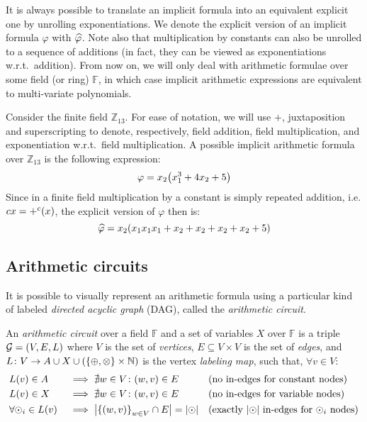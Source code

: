 It is always possible to translate an implicit formula into an equivalent explicit one by unrolling 
exponentiations.
We denote the explicit version of an implicit formula \(\varphi \) with \(\explicit{\varphi}\).
Note also that multiplication by constants can also be unrolled to a sequence of additions 
(in fact, they can be viewed as exponentiations w.r.t.\ addition).
From now on, we will only deal with arithmetic formulae over some field (or ring) \(\mathbb{F}\), 
in which case implicit arithmetic expressions are equivalent to multi-variate polynomials.
\begin{example}\label{ex:arithmetic_formula}
  Consider the finite field \(\mathbb{Z}_{13}\).
  For ease of notation, we will use \(+\), juxtaposition and superscripting to denote, respectively,
  field addition, field multiplication, and exponentiation w.r.t.\ field multiplication. 
  A possible implicit arithmetic formula over \(\mathbb{Z}_{13}\) is the following expression:
  \[\varphi = x_{2}\Parens*{x_{1}^{3} + 4x_{2} + 5}\]
  Since in a finite field multiplication by a constant is simply repeated addition, i.e. 
  \(cx = \call{+^{c}}{x}\), the explicit version of \(\varphi \) then is:
  \[\explicit{\varphi} = x_{2}\Parens*{x_{1}x_{1}x_{1} + x_{2} + x_{2} + x_{2} + x_{2} + 5}\]
\end{example} 

\subsection{Arithmetic circuits}
It is possible to visually represent an arithmetic formula using a particular kind of labeled 
\emph{directed acyclic graph} (DAG), called the \emph{arithmetic circuit}.
\begin{definition}
  An \emph{arithmetic circuit} over a field \(\mathbb{F}\) and a set of variables \(X\) over 
  \(\mathbb{F}\) is a triple \(\mathcal{G} = \Tuple{V, E, L}\) where 
  \(V\) is the set of \emph{vertices}, \(E \subseteq V \times V\) is the set of \emph{edges}, and 
  \(L\colon V \to A \cup X \cup \Parens*{\Set{\oplus, \otimes} \times \mathbb{N}}\) is 
  the vertex \emph{labeling map}, such that, \(\forall v \in V\):
  \begin{align*}
    & \call{L}{v} \in A && \implies \nexists w \in V\colon \Tuple{w, v} \in E
    && \textnormal{(no in-edges for constant nodes)} \\
    & \call{L}{v} \in X && \implies \nexists w \in V\colon \Tuple{w, v} \in E
    && \textnormal{(no in-edges for variable nodes)} \\
    & \forall \odot_i \in \call{L}{v} && \implies \abs{\Set{\Tuple{w, v}}_{w \in V} \cap E} = 
    \abs{\odot} && \textnormal{(exactly \(\abs{\odot}\) in-edges for \(\odot_i\) nodes)} \\
  \end{align*}
\end{definition}

